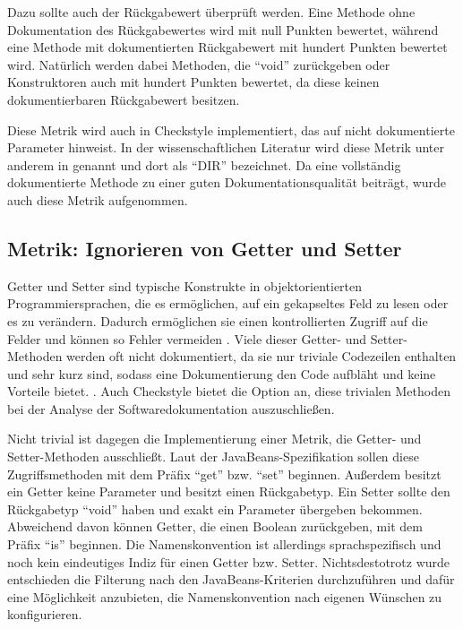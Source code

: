  Dazu sollte auch der Rückgabewert überprüft werden. Eine Methode ohne Dokumentation des Rückgabewertes wird mit null Punkten bewertet, während eine Methode mit dokumentierten Rückgabewert mit hundert Punkten bewertet wird. Natürlich werden dabei Methoden, die \enquote{void} zurückgeben oder Konstruktoren auch mit hundert Punkten bewertet, da diese keinen dokumentierbaren Rückgabewert besitzen. 
 
 Diese Metrik wird auch in Checkstyle implementiert, das auf nicht dokumentierte Parameter hinweist. In der wissenschaftlichen Literatur wird diese Metrik unter anderem in \cite[S. 5]{HowDocumentationEvolvesoverTime} genannt und dort als \enquote{DIR} bezeichnet. Da eine vollständig dokumentierte Methode zu einer guten Dokumentationsqualität beiträgt, wurde auch diese Metrik aufgenommen.

\subsection{Metrik: Ignorieren von Getter und Setter }
Getter und Setter sind typische Konstrukte in objektorientierten Programmiersprachen, die es ermöglichen, auf ein gekapseltes Feld zu lesen oder es zu verändern. Dadurch ermöglichen sie einen kontrollierten Zugriff auf die Felder und können so Fehler vermeiden \cite[S. 235]{OntheUseofPropertiesinJavaApplications}. Viele dieser Getter- und Setter-Methoden werden oft nicht dokumentiert, da sie nur triviale Codezeilen enthalten und sehr kurz sind, sodass eine Dokumentierung den Code aufbläht und keine Vorteile bietet. \cite[S. 254]{JavadocViolationsandTheirEvolutioninOpen-SourceSoftware}. Auch Checkstyle bietet die Option an, diese trivialen Methoden bei der Analyse der Softwaredokumentation auszuschließen. 

Nicht trivial ist dagegen die Implementierung einer Metrik, die Getter- und Setter-Methoden ausschließt. Laut der JavaBeans-Spezifikation \cite[S. 55]{javabeans} sollen diese Zugriffsmethoden mit dem Präfix \enquote{get} bzw. \enquote{set} beginnen. Außerdem besitzt ein Getter keine Parameter und besitzt einen Rückgabetyp. Ein Setter sollte den Rückgabetyp \enquote{void} haben und exakt ein Parameter übergeben bekommen. Abweichend davon können Getter, die einen Boolean zurückgeben, mit dem Präfix \enquote{is} beginnen. Die Namenskonvention ist allerdings sprachspezifisch und noch kein eindeutiges Indiz für einen Getter bzw. Setter. Nichtsdestotrotz wurde entschieden die Filterung nach den JavaBeans-Kriterien durchzuführen und dafür eine Möglichkeit anzubieten, die Namenskonvention nach eigenen Wünschen zu konfigurieren. 

